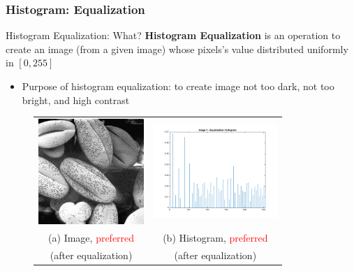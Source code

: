 \documentclass[english,11pt,table,handout]{beamer}
\begin{document}
\begin{frame}[fragile]
\frametitle{Histogram: Equalization}
\begin{block}{Histogram Equalization: What?}
	\textbf{Histogram Equalization} is an operation to create an image (from a given image) whose pixels's value distributed uniformly in $[0,255]$
	\begin{itemize}
		\item Purpose of histogram equalization: to create image not too dark, not too bright, and high contrast
	\end{itemize}
\end{block}
\begin{figure}[!h]
	\begin{table}
		\begin{tabular}{cc}
			\includegraphics[height=4cm]{./images/bean1_eq.png} &
			\includegraphics[height=3.5cm]{./images/histogram1_eq_norm.png} \\
			(a) Image, \textcolor{red}{ preferred} & (b) Histogram, \textcolor{red}{ preferred} \\
			(after equalization)  &  (after equalization)
			
		\end{tabular}
	\end{table}
\end{figure}
\end{frame}
\end{document}
